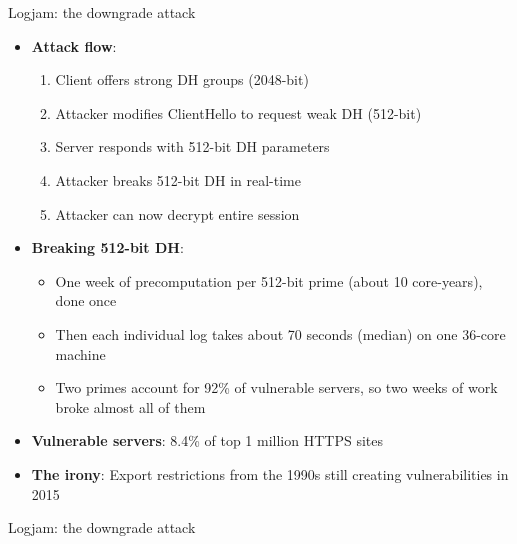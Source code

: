 \ifdefined\PRESENTATION\else\PassOptionsToClass{handout}{beamer}\fi\documentclass[aspectratio=169, lualatex]{beamer}
\begin{document}
\begin{frame}{Logjam: the downgrade attack}
	\begin{itemize}
		\item \textbf{Attack flow}:
		      \begin{enumerate}
			      \item Client offers strong DH groups (2048-bit)
			      \item Attacker modifies ClientHello to request weak DH (512-bit)
			      \item Server responds with 512-bit DH parameters
			      \item Attacker breaks 512-bit DH in real-time
			      \item Attacker can now decrypt entire session
		      \end{enumerate}
		\item \textbf{Breaking 512-bit DH}:
		      \begin{itemize}
			      \item One week of precomputation per 512-bit prime (about 10 core-years), done once
			      \item Then each individual log takes about 70 seconds (median) on one 36-core machine
			      \item Two primes account for 92\% of vulnerable servers, so two weeks of work broke almost all of them
		      \end{itemize}
		\item \textbf{Vulnerable servers}: 8.4\% of top 1 million HTTPS sites
		\item \textbf{The irony}: Export restrictions from the 1990s still creating vulnerabilities in 2015
	\end{itemize}
\end{frame}

\begin{frame}{Logjam: the downgrade attack}
\end{frame}
\end{document}
